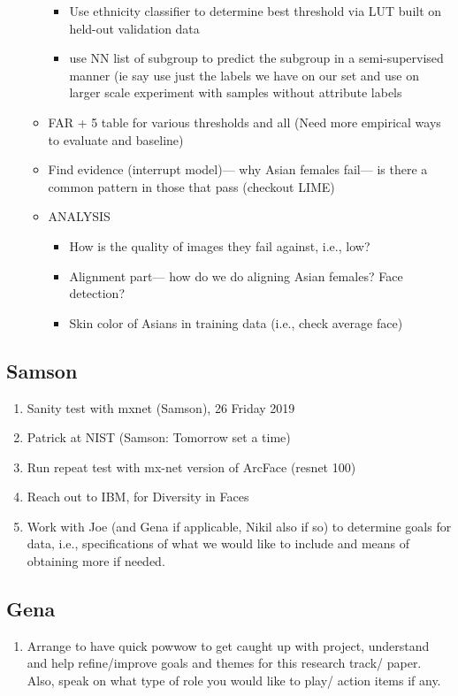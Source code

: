 \begin{enumerate}
\begin{itemize}
        \begin{itemize}
            \item Use ethnicity classifier to determine best threshold via LUT built on held-out validation data
            \item use NN list of subgroup to predict the subgroup in a semi-supervised manner (ie say use just the labels we have on our set and use on larger scale experiment with samples without attribute labels
        \end{itemize}
        \item FAR + 5 table for various thresholds and all (Need more empirical ways to evaluate and baseline) 
        \item Find evidence (interrupt model)— why Asian females fail— is there a common pattern in those that pass (checkout LIME)
    \item ANALYSIS
    \begin{itemize}
        \item How is the quality of images they fail against, i.e., low?
        \item  Alignment part— how do we do aligning Asian females? Face detection?
        \item Skin color of Asians in training data (i.e., check average face)

    \end{itemize}
    \end{itemize}
\end{enumerate}
\subsection{Samson}
\begin{enumerate}
    \item Sanity test with mxnet (Samson),  26 Friday 2019
    \item Patrick at NIST (Samson: Tomorrow set a time)
    \item Run repeat test with mx-net version of ArcFace (resnet 100)
    \item Reach out to IBM, for Diversity in Faces
    \item Work with Joe (and Gena if applicable, Nikil also if so) to determine goals for data, i.e., specifications of what we would like to include and means of obtaining more if needed.
    
\end{enumerate}
\subsection{Gena}
\begin{enumerate}
    \item Arrange to have quick powwow to get caught up with project, understand and help refine/improve goals and themes for this research track/ paper. Also, speak on what type of role you would like to play/ action items if any.
\end{enumerate}




